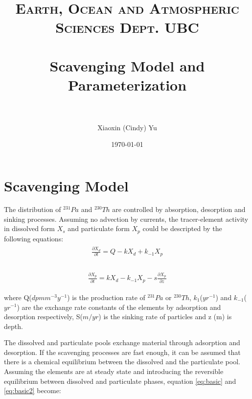 \documentclass[paper=a4, fontsize=11pt]{scrartcl} %
\title{   
\normalfont \normalsize
\textsc{Earth, Ocean and Atmospheric Sciences Dept. UBC} \\ [25pt] %
\horrule{0.5pt} \\[0.4cm] %
\huge Scavenging Model and Parameterization \\ %
\horrule{2pt} \\[0.5cm] %
}
\author{Xiaoxin (Cindy) Yu} %
\date{\normalsize\today} %
\numberwithin{equation}{section} %
\numberwithin{figure}{section} %
\numberwithin{table}{section} %
\begin{document}
\maketitle %


\section{Scavenging Model}


The distribution of $^{231}Pa$ and $^{230}Th$ are controlled by absorption, desorption and sinking processes. Assuming no advection by currents, the tracer-element activity in dissolved form $X_{s}$ and particulate form $X_{p}$ could be descripted by the following equations:
\begin{align}
\label{eq:basic}
\begin{split}
\frac{\partial X_{d}}{\partial t} = Q-kX_{d}+k_{-1}X_{p}\\
\end{split}
\end{align}

\begin{align}
\label{eq:basic2}
\begin{split}
\frac{\partial X_{p}}{\partial t} = kX_{d}-k_{-1}X_{p}-s\frac{\partial X_{p}}{\partial z}
\end{split}
\end{align}

where Q($dpm m^{-3}y^{-1}$) is the production rate of $^{231}Pa$ or $^{230}Th$, $k_{1}$($yr^{-1}$) and $k_{-1}$($yr^{-1}$) are the exchange rate constants of the elements by adsorption and desorption respectively, S($m/yr$) is the sinking rate of particles and z (m) is depth.

The dissolved and particulate pools exchange material through adsorption and desorption. If the scavenging processes are fast enough, it can be assumed that there is a chemical equilibrium between the dissolved and the particulate pool. Assuming the elements are at steady state and introducing the reversible equilibrium between dissolved and particulate phases, equation \ref{eq:basic} and \ref{eq:basic2} become:
\end{document}
